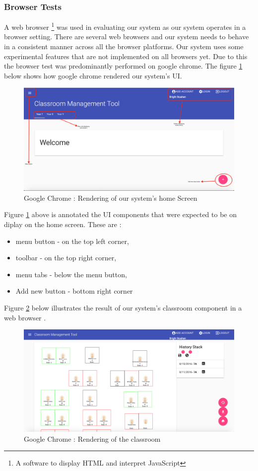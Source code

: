\subsubsection{Browser Tests}
A web browser \footnote{A software to display HTML and interpret JavaScript} was used in evaluating our system as our system operates in a browser setting. There are several web browsers and our system needs to behave in a consistent manner across all the browser platforms. Our system uses some experimental features that are not implemented on all browsers yet. Due to this the browser test was predominantly performed on google chrome. \cite{website:GoogleChrome}
The figure \ref{fig:homeScreen} below shows how google chrome rendered our system's UI.
\begin{figure}[!ht]
\caption{Google Chrome : Rendering of our system's home Screen}
    \label{fig:homeScreen}
    \centering
    \includegraphics[scale=0.3]{figures/home_screen}
\end{figure}
Figure \ref{fig:homeScreen} above is annotated the UI components that were expected to be on diplay on the home screen. These are :
\begin{itemize}
    \item menu button -  on the top left corner,
    \item toolbar - on the top right corner,
    \item menu tabs - below the menu button, 
    \item Add new button - bottom right corner
\end{itemize}
Figure \ref{fig:canvas} below illustrates the result of our system's classroom component in a web browser \cite{website:GoogleChrome}.
\begin{figure}[!ht]
    \caption{Google Chrome : Rendering of the classroom}
    \label{fig:canvas}
    \centering
    \includegraphics[scale=0.3]{figures/classroom}
\end{figure}
